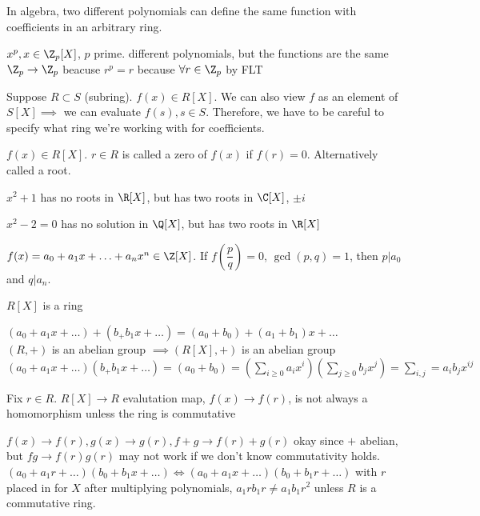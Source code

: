 \documentclass[twoside, 10pt]{article}
\begin{document}
\begin{rmk}
    In algebra, two different polynomials can define the same function with coefficients in an arbitrary ring.
\end{rmk}

$x^p, x \in \Z_p[X]$, $p$ prime. different polynomials, but the functions are the same $\Z_p \to \Z_p$ beacuse $r^p = r$ because $\forall r \in \Z_p$ by FLT

Suppose $R \subset S$ (subring). $f(x) \in R[X]$. We can also view $f$ as an element of $S[X] \implies $ we can evaluate $f(s), s\in S$. Therefore, we have to be careful to specify what ring we're working with for coefficients.

\begin{defn}
    $f(x) \in R[X]$. $r \in R$ is called a zero of $f(x)$ if $f(r) = 0$. Alternatively called a root.
\end{defn}

$x^2 + 1$ has no roots in $\R[X]$, but has two roots in $\C[X]$, $\pm i$

$x^2 - 2 = 0$ has no solution in $\Q[X]$, but has two roots in $\R[X]$

\begin{defn}
    $f(x) = a_0 + a_1x + \ldots + a_nx^n \in \Z[X]$. If $f(\dfrac{p}{q}) = 0$, $\gcd(p, q) = 1$, then $p | a_0$ and $q | a_n$.
\end{defn}

\begin{lem}
    $R[X]$ is a ring
\end{lem}
$(a_0 + a_1x + \ldots) + (b_ + b_1x + \ldots) = (a_0 + b_0) + (a_1 + b_1)x + \ldots$\\
$(R, +)$ is an abelian group $\implies (R[X], +)$ is an abelian group\\
$(a_0 + a_1x + \ldots)(b_ + b_1x + \ldots) = (a_0 + b_0) = (\sum\limits_{i \geq 0} a_i x^i)(\sum\limits_{j \geq 0}b_jx^j) = \sum\limits_{i, j} = a_ib_jx^{ij}$

\begin{rmk}
    Fix $r \in R$. $R[X] \to R$ evalutation map, $f(x) \to f(r)$, is not always a homomorphism unless the ring is commutative
\end{rmk}
$f(x) \to f(r), g(x) \to g(r), f + g \to f(r) + g(r)$ okay since $+$ abelian, but $fg \to f(r)g(r)$ may not work if we don't know commutativity holds.
$(a_0 + a_1r +\ldots)(b_0 + b_1x + \ldots) \iff (a_0 + a_1x + \ldots)(b_0 + b_1r + \ldots)$ with $r$ placed in for $X$ after multiplying polynomials, $a_1rb_1r \neq a_1b_1r^2$ unless $R$ is a commutative ring.
\end{document}

